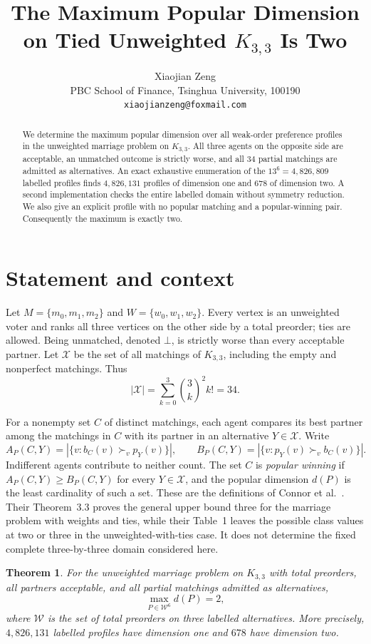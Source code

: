\documentclass[11pt]{article}
\title{The Maximum Popular Dimension on Tied Unweighted $K_{3,3}$ Is Two}
\author{Xiaojian Zeng\\
PBC School of Finance, Tsinghua University, 100190\\
\texttt{xiaojianzeng@foxmail.com}}
\date{}
\newtheorem{theorem}{Theorem}
\newcommand{\cX}{\mathcal X}
\newcommand{\cW}{\mathcal W}
\begin{document}
\maketitle

\begin{abstract}
We determine the maximum popular dimension over all weak-order preference
profiles in the unweighted marriage problem on $K_{3,3}$.  All three agents on
the opposite side are acceptable, an unmatched outcome is strictly worse, and
all $34$ partial matchings are admitted as alternatives.  An exact exhaustive
enumeration of the $13^6=4{,}826{,}809$ labelled profiles finds
$4{,}826{,}131$ profiles of dimension one and $678$ of dimension two.  A
second implementation checks the entire labelled domain without symmetry
reduction.  We also give an explicit profile with no popular matching and a
popular-winning pair.  Consequently the maximum is exactly two.
\end{abstract}

\section{Statement and context}

Let $M=\{m_0,m_1,m_2\}$ and $W=\{w_0,w_1,w_2\}$.  Every vertex is an
unweighted voter and ranks all three vertices on the other side by a total
preorder; ties are allowed.  Being unmatched, denoted $\bot$, is strictly
worse than every acceptable partner.  Let $\cX$ be the set of all matchings of
$K_{3,3}$, including the empty and nonperfect matchings.  Thus
\[
 |\cX|=\sum_{k=0}^3 \binom{3}{k}^2k!=34.
\]

For a nonempty set $C$ of distinct matchings, each agent compares its best
partner among the matchings in $C$ with its partner in an alternative
$Y\in\cX$.  Write
\[
 A_P(C,Y)=|\{v:b_C(v)\succ_v p_Y(v)\}|,
 \qquad
 B_P(C,Y)=|\{v:p_Y(v)\succ_v b_C(v)\}|.
\]
Indifferent agents contribute to neither count.  The set $C$ is
\emph{popular winning} if $A_P(C,Y)\geq B_P(C,Y)$ for every $Y\in\cX$, and
the popular dimension $d(P)$ is the least cardinality of such a set.
These are the definitions of Connor et al.~\cite{ConnorEtAl2026}.  Their
Theorem~3.3 proves the general upper bound three for the marriage problem with
weights and ties, while their Table~1 leaves the possible class values at two
or three in the unweighted-with-ties case.  It does not determine the fixed
complete three-by-three domain considered here.

\begin{theorem}\label{thm:main}
For the unweighted marriage problem on $K_{3,3}$ with total preorders, all
partners acceptable, and all partial matchings admitted as alternatives,
\[
 \max_{P\in\cW^6} d(P)=2,
\]
where $\cW$ is the set of total preorders on three labelled alternatives.
More precisely, $4{,}826{,}131$ labelled profiles have dimension one and
$678$ have dimension two.
\end{theorem}
\end{document}
